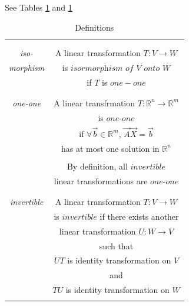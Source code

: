 See Tables \ref{eq:solutions/3/7/7/table:1} and \ref{eq:solutions/3/7/7/table:1}


\begin{table}[!ht]
	\begin{center}
		\begin{tabular}{|c|c|}
			\hline
			& \\
			& \\
			\textit{iso-} & A linear transformation $T : V\rightarrow W$\\
			\textit{morphism} & is $\textit{isormorphism of}$ $V$ $\textit{onto}$ $W$\\
			& if $T$ is $one-one$\\
			& \\
			\hline	
			& \\		
			\textit{one-one} & A linear transfrmation $T : \mathbb{R}^{n} \rightarrow \mathbb{R}^{m}$\\
			& is $\textit{one-one}$\\
			& if $\forall \vec{b} \in \mathbb{R}^{m}$,  $\vec{A}\vec{X} =\vec{b}$\\
			& has at most one solution in $\mathbb{R}^{n}$\\
			& \\
			& By definition, all $invertible$\\
			& linear transformations are $\textit{one-one}$\\
			& \\
			\hline
			& \\
			\textit{invertible} & A linear transformation $T : V \rightarrow W$\\
			& is $\textit{invertible}$ if there exists another\\
			& linear transformation $U: W \rightarrow V$\\
			& such that\\
			& $UT$ is identity transformation on $V$\\
			& and \\
			& $TU$ is identity transformation on $W$\\
			& \\
			\hline
		\end{tabular}
	\end{center}
\caption{Definitions}
\label{eq:solutions/3/7/7/table:1}
\end{table}
